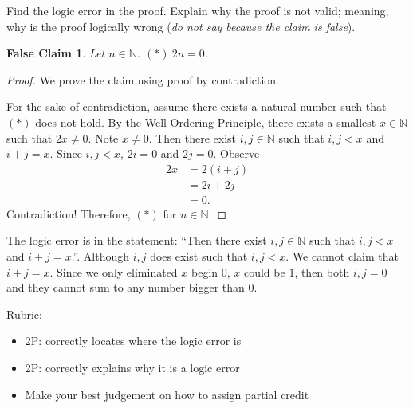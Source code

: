 \documentclass{article}
\newcommand{\N}{\mathbb{N}}
\newtheorem*{falseclaim}{False Claim}
\theoremstyle{definition}
\begin{document}
\begin{question}{4}
    Find the logic error in the proof. Explain why the proof is not valid; meaning, why is the proof logically wrong (\textit{do not say because the claim is false}).
    \begin{falseclaim}
    Let $n\in \mathbb{N}$. $(*) \ 2n=0$.
    \end{falseclaim}
    
    \begin{proof}
    We prove the claim using proof by contradiction.
    
     For the sake of contradiction, assume there exists a natural number such that $(*)$ does not hold. By the Well-Ordering Principle, there exists a smallest $x\in \N$ such that $2x\neq 0$. Note $x\neq 0$. Then there exist  $i, j\in \N$ such that $i, j<x$ and $i+j=x$. Since $i, j <x$, $2i=0$ and $2j=0$. Observe
      \begin{align*}
      2x &= 2(i+j)\\
      & = 2i+2j\\
      & = 0.
      \end{align*}
      Contradiction! Therefore, $(*)$ for $n\in \N$.
    \end{proof}
\end{question}
\begin{solution}
The logic error is in the statement: ``Then there exist  $i, j\in \N$ such that $i, j<x$ and $i+j=x$.''. Although $i, j$ does exist such that $i, j<x$. We cannot claim that $i+j=x$. Since we only eliminated $x$ begin $0$, $x$ could be $1$, then both $i, j=0$ and they cannot sum to any number bigger than 0.

{\color{red} Rubric:
\begin{itemize}
\item 2P: correctly locates where the logic error is
\item 2P: correctly explains why it is a logic error
\item Make your best judgement on how to assign partial credit
\end{itemize}}
\end{solution}
\end{document}
